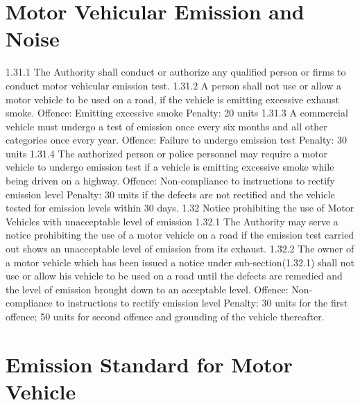 \documentclass[
]{book}
\begin{document}
\hypertarget{motor-vehicular-emission-and-noise}{%
\section{Motor Vehicular Emission and Noise}\label{motor-vehicular-emission-and-noise}}

1.31.1 The Authority shall conduct or authorize any qualified person or firms to conduct motor vehicular emission test.
1.31.2 A person shall not use or allow a motor vehicle to be used on a road, if the vehicle is emitting excessive exhaust smoke.
Offence: Emitting excessive smoke
Penalty: 20 units
1.31.3 A commercial vehicle must undergo a test of emission once every six months and all other categories once every year.
Offence: Failure to undergo emission test
Penalty: 30 units
1.31.4 The authorized person or police personnel may require a motor vehicle to undergo emission test if a vehicle is emitting excessive smoke while being driven on a highway.
Offence: Non-compliance to instructions to rectify emission level
Penalty: 30 units if the defects are not rectified and the vehicle tested for emission levels within 30 days.
1.32 Notice prohibiting the use of Motor Vehicles with unacceptable level of emission
1.32.1 The Authority may serve a notice prohibiting the use of a motor vehicle on a road if the emission test carried out shows an unacceptable level of emission from its exhaust.
1.32.2 The owner of a motor vehicle which has been issued a notice under sub-section(1.32.1) shall not use or allow his vehicle to be used on a road until the defects are remedied and the level of emission brought down to an acceptable level.
Offence: Non-compliance to instructions to rectify emission level
Penalty: 30 units for the first offence; 50 units for second offence and grounding of the vehicle thereafter.

\hypertarget{emission-standard-for-motor-vehicle}{%
\section{Emission Standard for Motor Vehicle}\label{emission-standard-for-motor-vehicle}}
\end{document}
